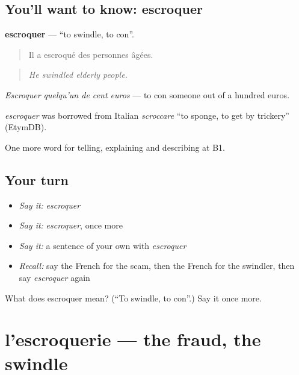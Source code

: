 \subsection*{You'll want to know: escroquer}
\textbf{escroquer} — \textquotedblleft{}to swindle, to con\textquotedblright{}.

\begin{quote}
Il a escroqué des personnes âgées.
\end{quote}

\begin{quote}
\emph{He swindled elderly people.}
\end{quote}

\emph{Escroquer quelqu'un de cent euros} — to con someone out of a hundred euros.

\begin{cousinweb}
\emph{escroquer} was borrowed from Italian \emph{scroccare} \textquotedblleft{}to sponge, to get by trickery\textquotedblright{} (EtymDB).
\end{cousinweb}

\begin{grammarlens}[title={What you've built}]
One more word for telling, explaining and describing at B1.
\end{grammarlens}

\subsection*{Your turn}
\begin{itemize}
\raggedright
  \item \emph{Say it:} \emph{escroquer}
  \item \emph{Say it:} \emph{escroquer}, once more
  \item \emph{Say it:} a sentence of your own with \emph{escroquer}
  \item \emph{Recall:} say the French for the scam, then the French for the swindler, then say \emph{escroquer} again
\end{itemize}

\begin{tcolorbox}[breakable,colback=teal!4,colframe=teal!35!black,title={Before you move on}]
What does escroquer mean? (\textquotedblleft{}To swindle, to con\textquotedblright{}.) Say it once more.
\end{tcolorbox}
\section[l'escroquerie]{l'escroquerie — the fraud, the swindle}

